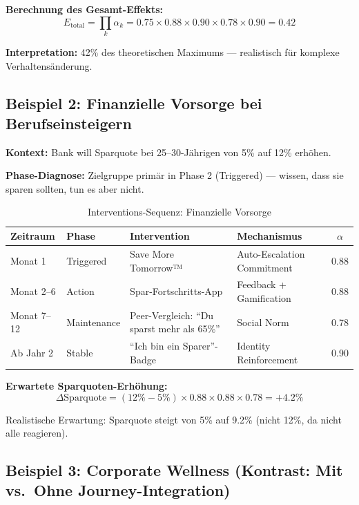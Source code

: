\textbf{Berechnung des Gesamt-Effekts:}
\begin{equation}
E_{\text{total}} = \prod_k \alpha_k = 0.75 \times 0.88 \times 0.90 \times 0.78 \times 0.90 = 0.42
\label{eq:18-thomas-effect}
\end{equation}

\textbf{Interpretation:} 42\% des theoretischen Maximums --- realistisch für komplexe Verhaltensänderung.

\subsection{Beispiel 2: Finanzielle Vorsorge bei Berufseinsteigern}

\textbf{Kontext:} Bank will Sparquote bei 25--30-Jährigen von 5\% auf 12\% erhöhen.

\textbf{Phase-Diagnose:} Zielgruppe primär in Phase 2 (Triggered) --- wissen, dass sie sparen sollten, tun es aber nicht.

\begin{table}[htbp]
\centering
\caption{Interventions-Sequenz: Finanzielle Vorsorge}
\label{tab:18-example-finance}
\renewcommand{\arraystretch}{1.3}
\small
\begin{tabular}{@{}llllc@{}}
\toprule
\textbf{Zeitraum} & \textbf{Phase} & \textbf{Intervention} & \textbf{Mechanismus} & \textbf{$\alpha$} \\
\midrule
Monat 1 & Triggered & Save More Tomorrow™ & Auto-Escalation Commitment & 0.88 \\
Monat 2--6 & Action & Spar-Fortschritts-App & Feedback + Gamification & 0.88 \\
Monat 7--12 & Maintenance & Peer-Vergleich: ``Du sparst mehr als 65\%'' & Social Norm & 0.78 \\
Ab Jahr 2 & Stable & ``Ich bin ein Sparer''-Badge & Identity Reinforcement & 0.90 \\
\bottomrule
\end{tabular}
\end{table}

\textbf{Erwartete Sparquoten-Erhöhung:}
\begin{equation}
\Delta \text{Sparquote} = (12\% - 5\%) \times 0.88 \times 0.88 \times 0.78 = +4.2\%
\label{eq:18-finance-effect}
\end{equation}

Realistische Erwartung: Sparquote steigt von 5\% auf 9.2\% (nicht 12\%, da nicht alle reagieren).

\subsection{Beispiel 3: Corporate Wellness (Kontrast: Mit vs.\ Ohne Journey-Integration)}

